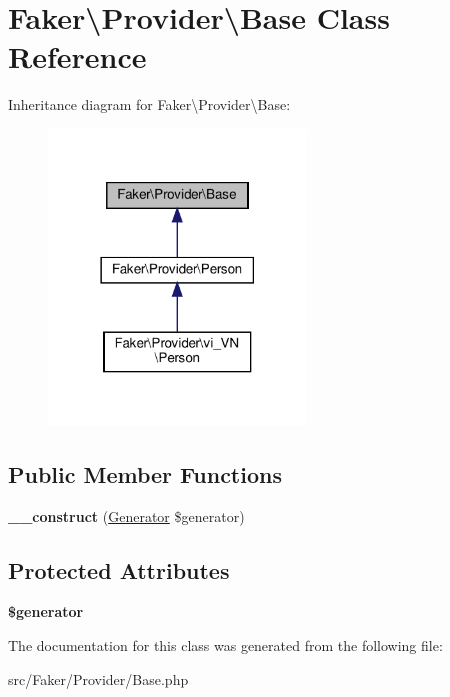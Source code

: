 \hypertarget{classFaker_1_1Provider_1_1Base}{}\section{Faker\textbackslash{}Provider\textbackslash{}Base Class Reference}
\label{classFaker_1_1Provider_1_1Base}


Inheritance diagram for Faker\textbackslash{}Provider\textbackslash{}Base\+:\nopagebreak
\begin{figure}[H]
\begin{center}
\leavevmode
\includegraphics[width=194pt]{classFaker_1_1Provider_1_1Base__inherit__graph}
\end{center}
\end{figure}
\subsection*{Public Member Functions}
\begin{DoxyCompactItemize}
\item 
\mbox{\label{classFaker_1_1Provider_1_1Base_a533c5296f9d9601d17fb9ad255d9fd5b}} 
{\bfseries \+\_\+\+\_\+construct} (\hyperlink{classFaker_1_1Generator}{Generator} \$generator)
\end{DoxyCompactItemize}
\subsection*{Protected Attributes}
\begin{DoxyCompactItemize}
\item 
\mbox{\label{classFaker_1_1Provider_1_1Base_ad0b9e102a8a02c5ee52f26aaeafcd203}} 
{\bfseries \$generator}
\end{DoxyCompactItemize}


The documentation for this class was generated from the following file\+:\begin{DoxyCompactItemize}
\item 
src/\+Faker/\+Provider/Base.\+php\end{DoxyCompactItemize}
